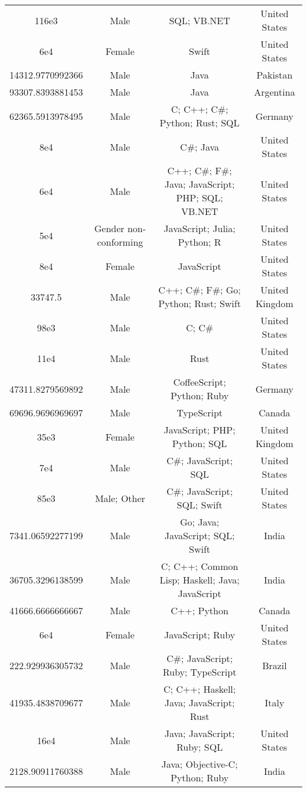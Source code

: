 \begin{center}
\begin{tabular}{ |c|c|c|c| }
116e3  &  Male  &  SQL; VB.NET  &  United States  \\ 
6e4  &  Female  &  Swift  &  United States  \\ 
14312.9770992366  &  Male  &  Java  &  Pakistan  \\ 
93307.8393881453  &  Male  &  Java  &  Argentina  \\ 
62365.5913978495  &  Male  &  C; C++; C\#; Python; Rust; SQL  &  Germany  \\ 
8e4  &  Male  &  C\#; Java  &  United States  \\ 
6e4  &  Male  &  C++; C\#; F\#; Java; JavaScript; PHP; SQL; VB.NET  &  United States  \\ 
5e4  &  Gender non-conforming  &  JavaScript; Julia; Python; R  &  United States  \\ 
8e4  &  Female  &  JavaScript  &  United States  \\ 
33747.5  &  Male  &  C++; C\#; F\#; Go; Python; Rust; Swift  &  United Kingdom  \\ 
98e3  &  Male  &  C; C\#  &  United States  \\ 
11e4  &  Male  &  Rust  &  United States  \\ 
47311.8279569892  &  Male  &  CoffeeScript; Python; Ruby  &  Germany  \\ 
69696.9696969697  &  Male  &  TypeScript  &  Canada  \\ 
35e3  &  Female  &  JavaScript; PHP; Python; SQL  &  United Kingdom  \\ 
7e4  &  Male  &  C\#; JavaScript; SQL  &  United States  \\ 
85e3  &  Male; Other  &  C\#; JavaScript; SQL; Swift  &  United States  \\ 
7341.06592277199  &  Male  &  Go; Java; JavaScript; SQL; Swift  &  India  \\ 
36705.3296138599  &  Male  &  C; C++; Common Lisp; Haskell; Java; JavaScript  &  India  \\ 
41666.6666666667  &  Male  &  C++; Python  &  Canada  \\ 
6e4  &  Female  &  JavaScript; Ruby  &  United States  \\ 
222.929936305732  &  Male  &  C\#; JavaScript; Ruby; TypeScript  &  Brazil  \\ 
41935.4838709677  &  Male  &  C; C++; Haskell; Java; JavaScript; Rust  &  Italy  \\ 
16e4  &  Male  &  Java; JavaScript; Ruby; SQL  &  United States  \\ 
2128.90911760388  &  Male  &  Java; Objective-C; Python; Ruby  &  India  \\ 

\end{tabular}
\end{center}
